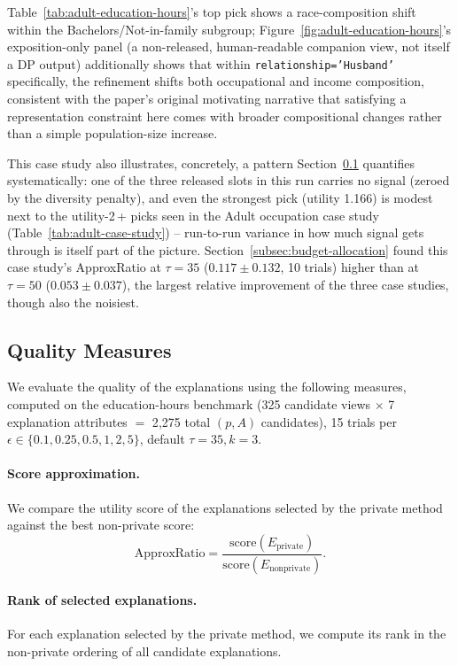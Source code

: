Table~\ref{tab:adult-education-hours}'s top pick shows a race-composition
shift within the Bachelors/Not-in-family subgroup;
Figure~\ref{fig:adult-education-hours}'s exposition-only panel (a
non-released, human-readable companion view, not itself a DP output)
additionally shows that within \texttt{relationship='Husband'}
specifically, the refinement shifts both occupational and income
composition, consistent with the paper's original motivating narrative
that satisfying a representation constraint here comes with broader
compositional changes rather than a simple population-size increase.

This case study also illustrates, concretely, a pattern
Section~\ref{subsec:quality-measures} quantifies systematically: one of
the three released slots in this run carries no signal (zeroed by the
diversity penalty), and even the strongest pick (utility 1.166) is modest
next to the utility-2\,+ picks seen in the Adult occupation case study
(Table~\ref{tab:adult-case-study}) -- run-to-run variance in how much
signal gets through is itself part of the picture.
Section~\ref{subsec:budget-allocation} found this case study's
ApproxRatio at $\tau{=}35$ ($0.117\pm0.132$, 10 trials) higher than at
$\tau{=}50$ ($0.053\pm0.037$), the largest relative improvement of the
three case studies, though also the noisiest.

\subsection{Quality Measures}
\label{subsec:quality-measures}

We evaluate the quality of the explanations using the following measures,
computed on the education-hours benchmark (325 candidate views $\times$
7 explanation attributes $=$ 2{,}275 total $(p,A)$ candidates), 15 trials
per $\epsilon \in \{0.1,0.25,0.5,1,2,5\}$, default $\tau{=}35,k{=}3$.

\paragraph{Score approximation.}
We compare the utility score of the explanations selected by the private method
against the best non-private score:
\[
    \mathrm{ApproxRatio}
    =
    \frac{\mathrm{score}(E_{\mathrm{private}})}
         {\mathrm{score}(E_{\mathrm{nonprivate}})}.
\]

\paragraph{Rank of selected explanations.}
For each explanation selected by the private method, we compute its rank in the
non-private ordering of all candidate explanations.

